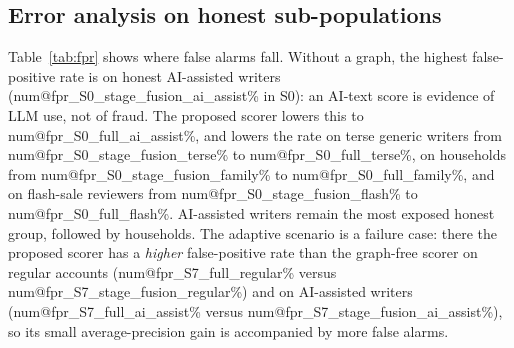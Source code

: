\documentclass[pdflatex,sn-basic]{sn-jnl}
\makeatletter
\theoremstyle{thmstyleone}
\theoremstyle{thmstylethree}
\newcommand{\num}[1]{\csname num@#1\endcsname}
\makeatother
\begin{document}
\subsection{Error analysis on honest sub-populations}\label{sec:res_fpr}
Table~\ref{tab:fpr} shows where false alarms fall. Without a graph, the highest false-positive rate is on honest AI-assisted writers (\num{fpr_S0_stage_fusion_ai_assist}\% in S0): an AI-text score is evidence of LLM use, not of fraud. The proposed scorer lowers this to \num{fpr_S0_full_ai_assist}\%, and lowers the rate on terse generic writers from \num{fpr_S0_stage_fusion_terse}\% to \num{fpr_S0_full_terse}\%, on households from \num{fpr_S0_stage_fusion_family}\% to \num{fpr_S0_full_family}\%, and on flash-sale reviewers from \num{fpr_S0_stage_fusion_flash}\% to \num{fpr_S0_full_flash}\%. AI-assisted writers remain the most exposed honest group, followed by households. The adaptive scenario is a failure case: there the proposed scorer has a \emph{higher} false-positive rate than the graph-free scorer on regular accounts (\num{fpr_S7_full_regular}\% versus \num{fpr_S7_stage_fusion_regular}\%) and on AI-assisted writers (\num{fpr_S7_full_ai_assist}\% versus \num{fpr_S7_stage_fusion_ai_assist}\%), so its small average-precision gain is accompanied by more false alarms.
\end{document}
